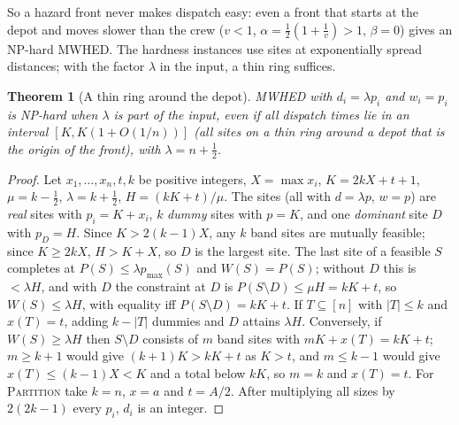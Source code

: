 \documentclass[pdflatex,sn-mathphys-ay]{sn-jnl}
\theoremstyle{thmstyleone}
\newtheorem{theorem}{Theorem}
\theoremstyle{thmstyletwo}
\theoremstyle{thmstylethree}
\begin{document}
So a hazard front never makes dispatch easy: even a front that starts at
the depot and moves slower than the crew ($v<1$, $\alpha=\frac12(1+\frac1v)>1$,
$\beta=0$) gives an NP-hard MWHED. The hardness instances use sites at
exponentially spread distances; with the factor $\lambda$ in the input,
a thin ring suffices.

\begin{theorem}[A thin ring around the depot]\label{thm:annulus}
MWHED with $d_i=\lambda p_i$ and $w_i=p_i$ is NP-hard when $\lambda$ is
part of the input, even if all dispatch times lie in an interval
$[K,K(1+O(1/n))]$ (all sites on a thin ring around a depot that is the
origin of the front), with $\lambda=n+\frac12$.
\end{theorem}

\begin{proof}
Let $x_1,\dots,x_n,t,k$ be positive integers, $X=\max x_i$,
$K=2kX+t+1$, $\mu=k-\frac12$, $\lambda=k+\frac12$, $H=(kK+t)/\mu$. The
sites (all with $d=\lambda p$, $w=p$) are \emph{real} sites with
$p_i=K+x_i$, $k$ \emph{dummy} sites with $p=K$, and one \emph{dominant}
site $D$ with $p_D=H$. Since $K>2(k-1)X$, any $k$ band sites are mutually
feasible; since $K\ge2kX$, $H>K+X$, so $D$ is the largest site. The last
site of a feasible $S$ completes at $P(S)\le\lambda p_{\max}(S)$ and
$W(S)=P(S)$; without $D$ this is $<\lambda H$, and with $D$ the
constraint at $D$ is $P(S\setminus D)\le\mu H=kK+t$, so
$W(S)\le\lambda H$, with equality iff $P(S\setminus D)=kK+t$. If
$T\subseteq[n]$ with $|T|\le k$ and $x(T)=t$, adding $k-|T|$ dummies and
$D$ attains $\lambda H$. Conversely, if $W(S)\ge\lambda H$ then $S\setminus D$
consists of $m$ band sites with $mK+x(T)=kK+t$; $m\ge k+1$ would give
$(k+1)K>kK+t$ as $K>t$, and $m\le k-1$ would give
$x(T)\le(k-1)X<K$ and a total below $kK$, so $m=k$ and $x(T)=t$. For
\textsc{Partition} take $k=n$, $x=a$ and $t=A/2$. After multiplying all
sizes by $2(2k-1)$ every $p_i$, $d_i$ is an integer. \end{proof}
\end{document}

